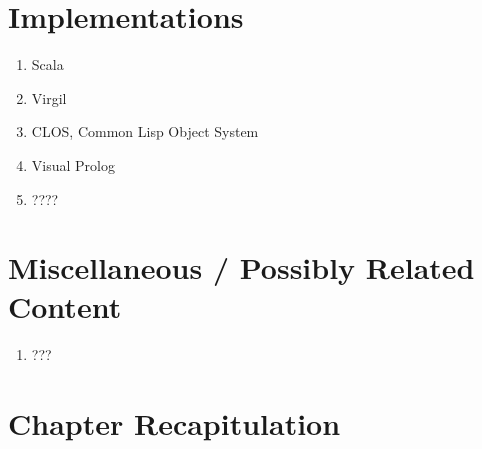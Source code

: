 \documentclass[thesis-solanki.tex]{subfiles}
\begin{document}
\section{Implementations}
\begin{enumerate}
\item Scala
\item Virgil
\item CLOS, Common Lisp Object System
\item Visual Prolog
\item ????
\end{enumerate}

\section{Miscellaneous / Possibly Related Content}
\begin{enumerate}
\item ???
\end{enumerate}



\section{Chapter Recapitulation}
\end{document}
